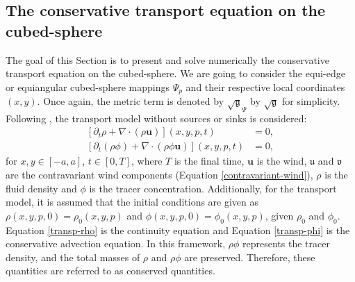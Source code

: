 \documentclass[preprint,12pt]{elsarticle}
\begin{document}
\begin{linenumbers}

\section{The conservative transport equation on the cubed-sphere}
\label{adv-2d}
The goal of this Section is to present and solve numerically the conservative transport equation on the cubed-sphere. 
We are going to consider the equi-edge or equiangular cubed-sphere mappings $\Psi_p$ and their respective local coordinates $(x,y)$.
Once again, the metric term is denoted by $\sqrt{\mathfrak{g}}_{\Psi}$ by $\sqrt{\mathfrak{g}}$ for simplicity.
Following \cite{nair:2010}, the transport model without sources or sinks is considered:
\begin{align}
	\label{transp-rho}
	[\partial_t \rho + \nabla \cdot (\rho \boldsymbol{u})](x,y,p,t)&=0,\\
	\label{transp-phi}
	[\partial_t (\rho \phi) + \nabla \cdot (\rho \phi \boldsymbol{u})](x,y,p,t)&=0,
\end{align}
for $x,y\in[-a,a]$, $t \in [0,T]$, where $T$ is the final time,
$\boldsymbol{u}$ is the wind, $\mathfrak{u}$ and $\mathfrak{v}$ are the contravariant wind components (Equation \ref{contravariant-wind}),
$\rho$ is the fluid density and $\phi$ is the tracer concentration.
Additionally, for the transport model, it is assumed that the initial conditions are given as $\rho(x,y,p,0)=\rho_0(x,y,p)$ and $\phi(x,y,p,0)=\phi_0(x,y,p)$, given $\rho_0$ and $\phi_0$. %
Equation \eqref{transp-rho} is the continuity equation and Equation \eqref{transp-phi} is the conservative advection equation.
In this framework, $\rho \phi$ represents the tracer density, and the total masses of $\rho$ and $\rho \phi$ are preserved.  Therefore, these quantities are referred to as conserved quantities.


\end{linenumbers}
\end{document}
